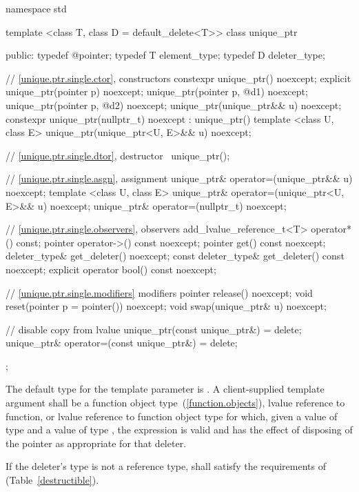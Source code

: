 \begin{codeblock}
namespace std {
  template <class T, class D = default_delete<T>> class unique_ptr {
  public:
    typedef @\seebelow@ pointer;
    typedef T element_type;
    typedef D deleter_type;

    // \ref{unique.ptr.single.ctor}, constructors
    constexpr unique_ptr() noexcept;
    explicit unique_ptr(pointer p) noexcept;
    unique_ptr(pointer p, @\seebelow@ d1) noexcept;
    unique_ptr(pointer p, @\seebelow@ d2) noexcept;
    unique_ptr(unique_ptr&& u) noexcept;
    constexpr unique_ptr(nullptr_t) noexcept
      : unique_ptr() { }
    template <class U, class E>
      unique_ptr(unique_ptr<U, E>&& u) noexcept;

    // \ref{unique.ptr.single.dtor}, destructor
    ~unique_ptr();

    // \ref{unique.ptr.single.asgn}, assignment
    unique_ptr& operator=(unique_ptr&& u) noexcept;
    template <class U, class E> unique_ptr& operator=(unique_ptr<U, E>&& u) noexcept;
    unique_ptr& operator=(nullptr_t) noexcept;

    // \ref{unique.ptr.single.observers}, observers
    add_lvalue_reference_t<T> operator*() const;
    pointer operator->() const noexcept;
    pointer get() const noexcept;
    deleter_type& get_deleter() noexcept;
    const deleter_type& get_deleter() const noexcept;
    explicit operator bool() const noexcept;

    // \ref{unique.ptr.single.modifiers} modifiers
    pointer release() noexcept;
    void reset(pointer p = pointer()) noexcept;
    void swap(unique_ptr& u) noexcept;

    // disable copy from lvalue
    unique_ptr(const unique_ptr&) = delete;
    unique_ptr& operator=(const unique_ptr&) = delete;
  };
}
\end{codeblock}

\pnum
The default type for the template parameter  is
. A client-supplied template argument
 shall be a function
object type~(\ref{function.objects}), lvalue reference to function, or
lvalue reference to function object type
for which, given
a value  of type  and a value
 of type , the expression
 is valid and has the effect of disposing of the
pointer as appropriate for that deleter.

\pnum
If the deleter's type  is not a reference type,  shall satisfy
the requirements of  (Table~\ref{destructible}).

